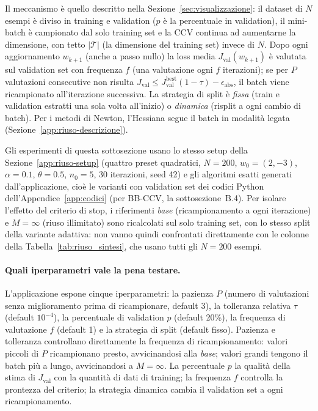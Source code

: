Il meccanismo è quello descritto nella Sezione~\ref{sec:visualizzazione}: il
dataset di $N$ esempi è diviso in training e validation ($p$ è la
percentuale in validation), il mini-batch è campionato dal solo training set
e la CCV continua ad aumentarne la dimensione, con tetto
$\lvert\mathcal{T}\rvert$ (la dimensione del training set) invece di $N$.
Dopo ogni aggiornamento $w_{k+1}$ (anche a passo nullo) la loss media
$J_{\mathrm{val}}(w_{k+1})$ è valutata sul validation set con frequenza $f$
(una valutazione ogni $f$ iterazioni); se per $P$ valutazioni consecutive
non risulta $J_{\mathrm{val}} \le J_{\mathrm{val}}^{\mathrm{best}}(1-\tau)
- \epsilon_{\mathrm{abs}}$, il batch viene ricampionato all'iterazione
successiva. La strategia di split è \emph{fissa} (train e validation estratti
una sola volta all'inizio) o \emph{dinamica} (risplit a ogni cambio di
batch). Per i metodi di Newton, l'Hessiana segue il batch in modalità legata
(Sezione~\ref{app:riuso-descrizione}).

Gli esperimenti di questa sottosezione usano lo stesso setup della
Sezione~\ref{app:riuso-setup} (quattro preset quadratici, $N=200$, $w_0=(2,-3)$,
$\alpha=0.1$, $\theta=0.5$, $n_0=5$, 30 iterazioni, seed 42) e gli algoritmi
esatti generati dall'applicazione, cioè le varianti con validation set dei
codici Python dell'Appendice~\ref{app:codici} (per BB-CCV, la
sottosezione~B.4). Per isolare l'effetto
del criterio di stop, i riferimenti \emph{base} (ricampionamento a ogni
iterazione) e $M=\infty$ (riuso illimitato) sono ricalcolati sul solo
training set, con lo stesso split della variante adattiva: non vanno quindi
confrontati direttamente con le colonne della Tabella~\ref{tab:riuso_sintesi},
che usano tutti gli $N=200$ esempi.

\paragraph{Quali iperparametri vale la pena testare.}
L'applicazione espone cinque iperparametri: la pazienza $P$ (numero di
valutazioni senza miglioramento prima di ricampionare, default 3), la
tolleranza relativa $\tau$ (default $10^{-4}$), la percentuale di validation
$p$ (default 20\%), la frequenza di valutazione $f$ (default 1) e la
strategia di split (default fisso). Pazienza e tolleranza controllano
direttamente la frequenza di ricampionamento: valori piccoli di $P$
ricampionano presto, avvicinandosi alla \emph{base}; valori grandi tengono
il batch più a lungo, avvicinandosi a $M=\infty$. La percentuale $p$
la qualità della stima di $J_{\mathrm{val}}$ con la quantità di
dati di training; la frequenza $f$ controlla la prontezza del criterio; la
strategia dinamica cambia il validation set a ogni ricampionamento.


